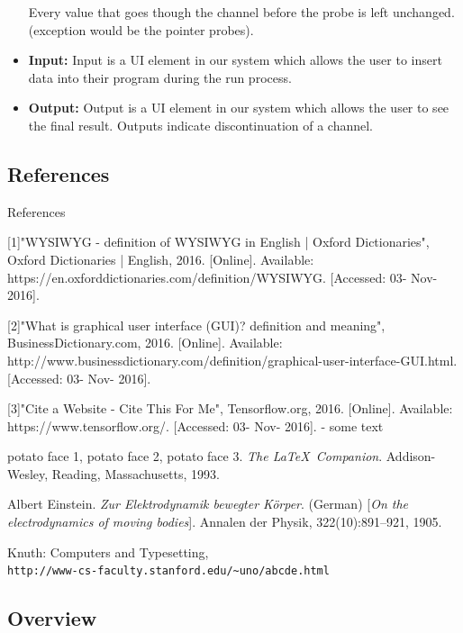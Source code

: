 \documentclass[journal,10pt,onecolumn,compsoc]{IEEEtran} \usepackage[margin=1.0in]{geometry} \usepackage{pdfpages} \usepackage{graphicx}
\begin{document}
\begin{itemize}
		Every value that goes though the channel before the probe is left unchanged. (exception would be the pointer probes).\\
	\item \textbf{Input:}
		Input is a UI element in our system which allows the user to insert data into their program during the run process.\\
	\item \textbf{Output:}
		Output is a UI element in our system which allows the user to see the final result. Outputs indicate discontinuation of a channel.\\
\end{itemize}
\subsection{References}
References

[1]"WYSIWYG - definition of WYSIWYG in English | Oxford Dictionaries", Oxford Dictionaries | English, 2016. [Online]. Available: https://en.oxforddictionaries.com/definition/WYSIWYG. [Accessed: 03- Nov- 2016].

[2]"What is graphical user interface (GUI)? definition and meaning", BusinessDictionary.com, 2016. [Online]. Available: http://www.businessdictionary.com/definition/graphical-user-interface-GUI.html. [Accessed: 03- Nov- 2016].

[3]"Cite a Website - Cite This For Me", Tensorflow.org, 2016. [Online]. Available: https://www.tensorflow.org/. [Accessed: 03- Nov- 2016].
- some text \\
\begin{thebibliography}{7}
	potato face 1, potato face 2, potato face 3. 
	\textit{The \LaTeX\ Companion}. 
	Addison-Wesley, Reading, Massachusetts, 1993.
 
	Albert Einstein. 
	\textit{Zur Elektrodynamik bewegter K{\"o}rper}. (German) 
	[\textit{On the electrodynamics of moving bodies}]. 
	Annalen der Physik, 322(10):891–921, 1905.
 
	Knuth: Computers and Typesetting,
	\\\texttt{http://www-cs-faculty.stanford.edu/\~{}uno/abcde.html}
\end{thebibliography}

\subsection{Overview}
\end{document}
